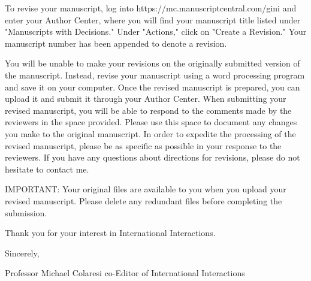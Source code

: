 To revise your manuscript, log into https://mc.manuscriptcentral.com/gini and enter your Author Center, where you will find your manuscript title listed under "Manuscripts with Decisions."  Under "Actions," click on "Create a Revision."  Your manuscript number has been appended to denote a revision.

You will be unable to make your revisions on the originally submitted version of the manuscript.  Instead, revise your manuscript using a word processing program and save it on your computer. Once the revised manuscript is prepared, you can upload it and submit it through your Author Center.
When submitting your revised manuscript, you will be able to respond to the comments made by the reviewers in the space provided.  Please use this space to document any changes you make to the original manuscript.  In order to expedite the processing of the revised manuscript, please be as specific as possible in your response to the reviewers. If you have any questions about directions for revisions, please do not hesitate to contact me.

IMPORTANT:  Your original files are available to you when you upload your revised manuscript.  Please delete any redundant files before completing the submission.

Thank you for your interest in International Interactions.

Sincerely,

Professor Michael Colaresi
co-Editor of International Interactions